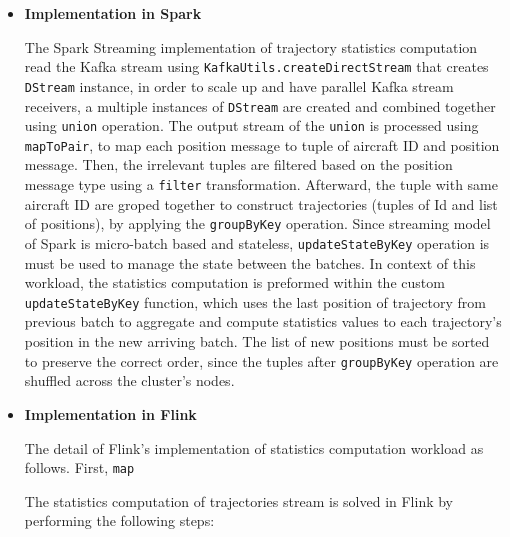 \documentclass[]{article}
\begin{document}
\begin{itemize}
\item {\bf{Implementation in Spark }}

\par The Spark Streaming implementation of trajectory statistics computation read the Kafka stream using \texttt{KafkaUtils.createDirectStream} that creates \texttt{DStream} instance, in order to scale up and have parallel Kafka stream receivers, a multiple instances of \texttt{DStream} are created and combined together using \texttt{union} operation. The output stream of the \texttt{union} is processed using \texttt{mapToPair}, to map each position message to tuple of aircraft ID and position message. Then, the irrelevant tuples are filtered based on the position message type using  a \texttt{filter} transformation. Afterward, the tuple with same aircraft ID are groped together to construct trajectories (tuples of Id and list of positions), by applying the \texttt{groupByKey} operation. Since streaming model of Spark is micro-batch based and stateless, \texttt{updateStateByKey} operation is must be used to manage the state between the batches. In context of this workload, the statistics computation is preformed within the custom \texttt{updateStateByKey} function, which uses the last position of trajectory from previous batch to aggregate and compute statistics values to each trajectory's position in the new arriving batch.  The list of new positions must be sorted to preserve the correct order, since the tuples after \texttt{groupByKey} operation are shuffled across the cluster's  nodes.

\item {\bf{Implementation in Flink }}


The detail of Flink's implementation of statistics computation workload as follows. First, \texttt{map}



The statistics computation of trajectories stream is solved in Flink by performing the following steps: 


\end{itemize}
\end{document}
